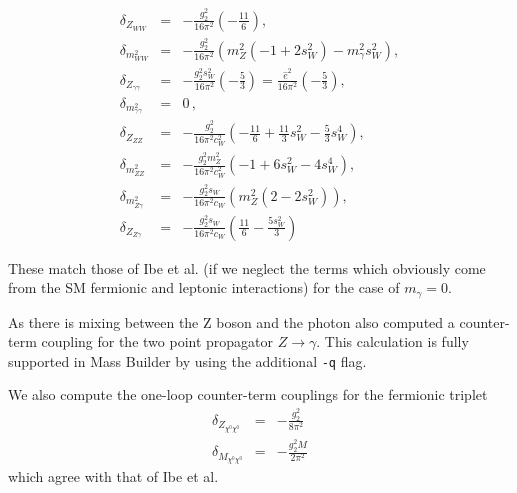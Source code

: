 \documentclass[11pt]{article}
\newcommand{\mb}{\textsf{Mass Builder} \! }
\begin{document}
\begin{eqnarray}
\delta_{Z_{WW}} &=&- \frac{g_2^2}{16 \pi^2}\left(-\frac{11}{6}\right),\\
\delta_{m^2_{WW}}&=&- \frac{g_2^2}{16 \pi^2} \left( m^2_Z(-1+2s_W^2)     -m_{\gamma}^2s_W^2\right),\\
\delta_{Z_{\gamma\gamma}} &=&-\frac{g_2^2s_W^2}{16 \pi^2}\left(-\frac{5}{3}\right) = \frac{\hat{e}^2}{16\pi^2}\left(-\frac{5}{3}\right) , \\
\delta_{m^2_{\gamma\gamma}} &=& 0\, ,\\
\delta_{Z_{ZZ}} &=&-\frac{g_2^2}{16 \pi^2 c_W^2} \left(-\frac{11}{6}+\frac{11}{3}s_W^2-\frac{5}{3}s_W^4  \right),\\
\delta_{m^2_{ZZ}} &=& -\frac{g_2^2m_Z^2}{16 \pi^2c_W^2} \left(-1+6s_W^2-4s_W^4  \right),\\
\delta_{m^2_{Z\gamma}} &=& -\frac{g_2^2s_W}{16 \pi^2c_W} \left( m_Z^2(2-2s_W^2)  \right),\\
\delta_{Z_{Z\gamma}} &=& -\frac{g_2^2s_W}{16 \pi^2c_W} \left( \frac{11}{6}-\frac{5s_W^2}{3}  \right)
\end{eqnarray}

These match those of Ibe et al. (if we neglect the terms which obviously come from the SM fermionic and leptonic interactions) for the case of $m_{\gamma}=0$.

As there is mixing between the Z boson and the photon also computed a counter-term coupling for the two point propagator $Z\rightarrow\gamma$.  This calculation is fully supported in \mb by using the additional \lstinline{-q} flag.

We also compute the one-loop counter-term couplings for the fermionic triplet
\begin{eqnarray}
\delta_{Z_{\chi^0\chi^0}} &=&-\frac{g_2^2}{8 \pi^2}\\
\delta_{M_{\chi^0\chi^0}} &=&-\frac{g_2^2 M}{2 \pi^2}
\end{eqnarray}
which agree with that of Ibe et al.

 
\end{document}
